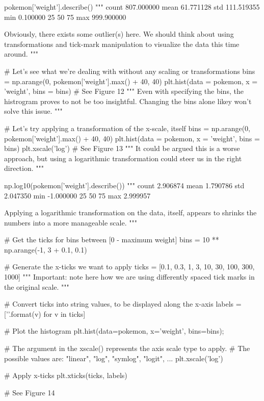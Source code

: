 \begin{python}
	pokemon['weight'].describe()
	"""
	count    807.000000
	mean      61.771128
	std      111.519355
	min        0.100000
	25%
	50%
	75%
	max      999.900000
	
	Obviously, there exists some outlier(s) here. We should think about using transformations and tick-mark manipulation to visualize the data this time around.
	"""
	
	# Let's see what we're dealing with without any scaling or transformations
	bins = np.arange(0, pokemon['weight'].max() + 40, 40)
	plt.hist(data = pokemon, x = 'weight', bins = bins)
	# See Figure 12
	"""
	Even with specifying the bins, the histrogram proves to not be too insightful. Changing the bins alone likey won't solve this issue.
	"""
	
	# Let's try applying a transformation of the x-scale, itself
	bins = np.arange(0, pokemon['weight'].max() + 40, 40)
	plt.hist(data = pokemon, x = 'weight', bins = bins)
	plt.xscale('log')
	# See Figure 13
	"""
	It could be argued this is a worse approach, but using a logarithmic transformation could steer us in the right direction.
	"""
	
	np.log10(pokemon['weight'].describe())
	"""
	count    2.906874
	mean     1.790786
	std      2.047350
	min     -1.000000
	25%
	50%
	75%
	max      2.999957
	
	Applying a logarithmic transformation on the data, itself, appears to shrinks the numbers into a more manageable scale.
	"""
	
	# Get the ticks for bins between [0 - maximum weight]
	bins = 10 ** np.arange(-1, 3 + 0.1, 0.1)
	
	# Generate the x-ticks we want to apply
	ticks = [0.1, 0.3, 1, 3, 10, 30, 100, 300, 1000]
	"""
	Important: note here how we are using differently spaced tick marks in the original scale.
	"""
	
	# Convert ticks into string values, to be displayed along the x-axis
	labels = ['{}'.format(v) for v in ticks]
	
	# Plot the histogram
	plt.hist(data=pokemon, x='weight', bins=bins);
	
	# The argument in the xscale() represents the axis scale type to apply.
	# The possible values are: {"linear", "log", "symlog", "logit", ...}
	plt.xscale('log')
	
	# Apply x-ticks
	plt.xticks(ticks, labels)
	
	# See Figure 14
\end{python}

